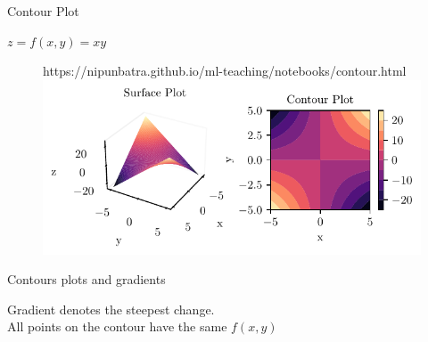 \documentclass{beamer}
\begin{document}
\begin{frame}{Contour Plot}

$z = f(x,y) = xy$\\

\begin{figure}[htp]
	\centering
	\begin{notebookbox}{https://nipunbatra.github.io/ml-teaching/notebooks/contour.html}
	  \includegraphics[width=\linewidth]{../assets/mathematical-ml/figures/contour-x_times_y.pdf}
	\end{notebookbox}
  \end{figure}

\end{frame}









\begin{frame}{Contours plots and gradients}
    
    
    Gradient denotes the steepest change.\\
    All points on the contour have the same $f(x,y)$\\
    
    
\end{frame}
\end{document}
